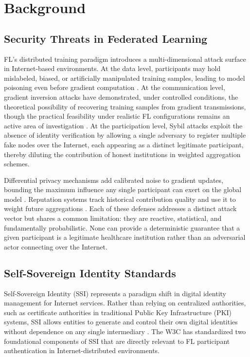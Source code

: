 \documentclass{sbc2023}
\begin{document}
\section{Background}
\label{sec:background}

\subsection{Security Threats in Federated Learning}

FL's distributed training paradigm introduces a multi-dimensional attack surface in Internet-based environments. At the data level, participants may hold mislabeled, biased, or artificially manipulated training samples, leading to model poisoning even before gradient computation \citep{jimenez2025security}. At the communication level, gradient inversion attacks have demonstrated, under controlled conditions, the theoretical possibility of recovering training samples from gradient transmissions, though the practical feasibility under realistic FL configurations remains an active area of investigation \citep{valadi2025research}. At the participation level, Sybil attacks exploit the absence of identity verification by allowing a single adversary to register multiple fake nodes over the Internet, each appearing as a distinct legitimate participant, thereby diluting the contribution of honest institutions in weighted aggregation schemes.

Differential privacy mechanisms add calibrated noise to gradient updates, bounding the maximum influence any single participant can exert on the global model \citep{abadi2016deep}. Reputation systems track historical contribution quality and use it to weight future aggregations \citep{10.1007/978-981-99-7032-2_3}. Each of these defenses addresses a distinct attack vector but shares a common limitation: they are reactive, statistical, and fundamentally probabilistic. None can provide a deterministic guarantee that a given participant is a legitimate healthcare institution rather than an adversarial actor connecting over the Internet.

\subsection{Self-Sovereign Identity Standards}

Self-Sovereign Identity (SSI) represents a paradigm shift in digital identity management for Internet services. Rather than relying on centralized authorities, such as certificate authorities in traditional Public Key Infrastructure (PKI) systems, SSI allows entities to generate and control their own digital identities without dependence on any single intermediary \citep{kubach2024taxonomy}. The W3C has standardized two foundational components of SSI that are directly relevant to FL participant authentication in Internet-distributed environments.
\end{document}
